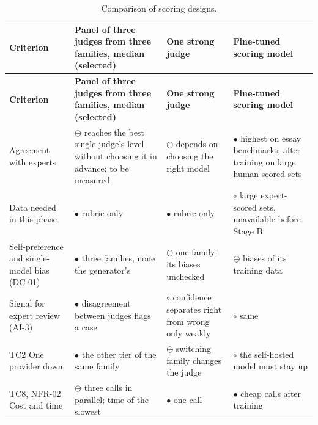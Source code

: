 {\small{}\renewcommand{\arraystretch}{1.1}
\begin{longtable}{|>{\raggedright\arraybackslash}p{}|>{\raggedright\arraybackslash}p{}|>{\raggedright\arraybackslash}p{}|>{\raggedright\arraybackslash}p{}|}
\caption{Comparison of scoring designs.} \\
\hline
\textbf{Criterion} & \textbf{Panel of three judges from three families, median (selected)} & \textbf{One strong judge} & \textbf{Fine-tuned scoring model} \\ \hline
\endfirsthead
\hline
\textbf{Criterion} & \textbf{Panel of three judges from three families, median (selected)} & \textbf{One strong judge} & \textbf{Fine-tuned scoring model} \\ \hline
\endhead
Agreement with experts & $\ominus$ reaches the best single judge's level without choosing it in advance\cite{r123}; to be measured & $\ominus$ depends on choosing the right model & $\bullet$ highest on essay benchmarks\cite{r125}, after training on large human-\allowbreak{}scored sets \\ \hline
Data needed in this phase & $\bullet$ rubric only & $\bullet$ rubric only & $\circ$ large expert-\allowbreak{}scored sets, unavailable before Stage B \\ \hline
Self-\allowbreak{}preference and single-\allowbreak{}model bias (DC-01) & $\bullet$ three families, none the generator's\cite{r128} & $\ominus$ one family; its biases unchecked & $\ominus$ biases of its training data \\ \hline
Signal for expert review (AI-3) & $\bullet$ disagreement between judges flags a case & $\circ$ confidence separates right from wrong only weakly\cite{r117} & $\circ$ same \\ \hline
TC2 One provider down & $\bullet$ the other tier of the same family & $\ominus$ switching family changes the judge & $\circ$ the self-hosted model must stay up \\ \hline
TC8, NFR-02 Cost and time & $\ominus$ three calls in parallel; time of the slowest & $\bullet$ one call & $\bullet$ cheap calls after training \\ \hline
\end{longtable}
}

